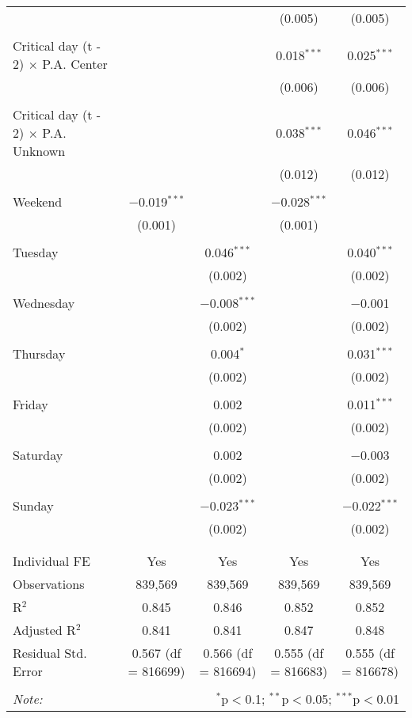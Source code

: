 \documentclass[
]{article}
\begin{document}
\begin{table}[!htbp]
{\begin{tabular}{@{\extracolsep{5pt}}lcccc}
  &  &  & (0.005) & (0.005) \\ 
  & & & & \\ 
 Critical day (t - 2) $\times$ P.A. Center &  &  & 0.018$^{***}$ & 0.025$^{***}$ \\ 
  &  &  & (0.006) & (0.006) \\ 
  & & & & \\ 
 Critical day (t - 2) $\times$ P.A. Unknown &  &  & 0.038$^{***}$ & 0.046$^{***}$ \\ 
  &  &  & (0.012) & (0.012) \\ 
  & & & & \\ 
 Weekend & $-$0.019$^{***}$ &  & $-$0.028$^{***}$ &  \\ 
  & (0.001) &  & (0.001) &  \\ 
  & & & & \\ 
 Tuesday &  & 0.046$^{***}$ &  & 0.040$^{***}$ \\ 
  &  & (0.002) &  & (0.002) \\ 
  & & & & \\ 
 Wednesday &  & $-$0.008$^{***}$ &  & $-$0.001 \\ 
  &  & (0.002) &  & (0.002) \\ 
  & & & & \\ 
 Thursday &  & 0.004$^{*}$ &  & 0.031$^{***}$ \\ 
  &  & (0.002) &  & (0.002) \\ 
  & & & & \\ 
 Friday &  & 0.002 &  & 0.011$^{***}$ \\ 
  &  & (0.002) &  & (0.002) \\ 
  & & & & \\ 
 Saturday &  & 0.002 &  & $-$0.003 \\ 
  &  & (0.002) &  & (0.002) \\ 
  & & & & \\ 
 Sunday &  & $-$0.023$^{***}$ &  & $-$0.022$^{***}$ \\ 
  &  & (0.002) &  & (0.002) \\ 
  & & & & \\ 
\hline \\[-1.8ex] 
Individual FE & Yes & Yes & Yes & Yes \\ 
Observations & 839,569 & 839,569 & 839,569 & 839,569 \\ 
R$^{2}$ & 0.845 & 0.846 & 0.852 & 0.852 \\ 
Adjusted R$^{2}$ & 0.841 & 0.841 & 0.847 & 0.848 \\ 
Residual Std. Error & 0.567 (df = 816699) & 0.566 (df = 816694) & 0.555 (df = 816683) & 0.555 (df = 816678) \\ 
\hline 
\hline \\[-1.8ex] 
\textit{Note:}  & \multicolumn{4}{r}{$^{*}$p$<$0.1; $^{**}$p$<$0.05; $^{***}$p$<$0.01} \\ 
\end{tabular}
} 
\end{table} 
\newpage
\end{document}
